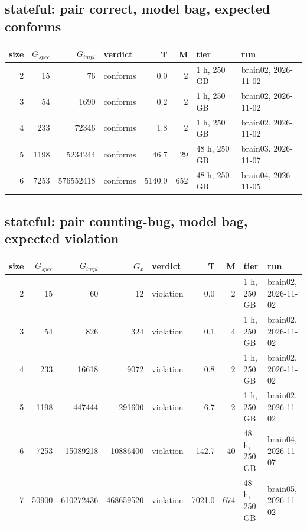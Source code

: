 \documentclass[10pt]{article}
\begin{document}
\subsection*{stateful: pair \textsf{correct}, model bag, expected conforms}
\begin{longtable}{@{}rrrlrrll@{}}
\toprule
size & $G_{\mathit{spec}}$ & $G_{\mathit{impl}}$ & verdict & T & M & tier & run \\
\midrule
\endhead
\color{blue} 2 & 15 & 76 & conforms & 0.0 & 2 & 1 h, 250 GB & brain02, 2026-11-02 \\
\color{blue} 3 & 54 & 1690 & conforms & 0.2 & 2 & 1 h, 250 GB & brain02, 2026-11-02 \\
\color{blue} 4 & 233 & 72346 & conforms & 1.8 & 2 & 1 h, 250 GB & brain02, 2026-11-02 \\
\color{blue} 5 & 1198 & 5234244 & conforms & 46.7 & 29 & 48 h, 250 GB & brain03, 2026-11-07 \\
\color{blue} 6 & 7253 & 576552418 & conforms & 5140.0 & 652 & 48 h, 250 GB & brain04, 2026-11-05 \\
\bottomrule
\end{longtable}
\subsection*{stateful: pair \textsf{counting-bug}, model bag, expected violation}
\begin{longtable}{@{}rrrrlrrll@{}}
\toprule
size & $G_{\mathit{spec}}$ & $G_{\mathit{impl}}$ & $G_x$ & verdict & T & M & tier & run \\
\midrule
\endhead
\color{blue} 2 & 15 & 60 & 12 & violation & 0.0 & 2 & 1 h, 250 GB & brain02, 2026-11-02 \\
\color{blue} 3 & 54 & 826 & 324 & violation & 0.1 & 4 & 1 h, 250 GB & brain02, 2026-11-02 \\
\color{blue} 4 & 233 & 16618 & 9072 & violation & 0.8 & 2 & 1 h, 250 GB & brain02, 2026-11-02 \\
\color{blue} 5 & 1198 & 447444 & 291600 & violation & 6.7 & 2 & 1 h, 250 GB & brain02, 2026-11-02 \\
\color{blue} 6 & 7253 & 15089218 & 10886400 & violation & 142.7 & 40 & 48 h, 250 GB & brain04, 2026-11-07 \\
\color{blue} 7 & 50900 & 610272436 & 468659520 & violation & 7021.0 & 674 & 48 h, 250 GB & brain05, 2026-11-02 \\
\bottomrule
\end{longtable}
\end{document}
